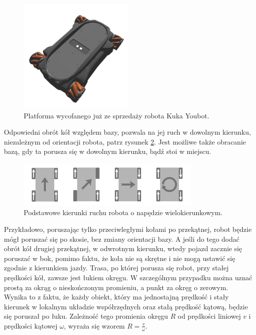	\begin{figure}[H]
	\centering
	\includegraphics[width=0.5\textwidth]{graphics/kuka_youbot.png}
	\caption{Platforma wycofanego już ze sprzedaży robota Kuka Youbot.}
	\label{fig:kuka_youbot}
	\end{figure} 

	Odpowiedni obrót kół względem bazy, pozwala na jej ruch w dowolnym kierunku, niezależnym od orientacji robota, patrz rysunek \ref{fig:mecanum_dirs}.
	Jest możliwe także obracanie bazą, gdy ta porusza się w dowolnym kierunku, bądź stoi w miejscu.
	
	\begin{figure}[H]
	\centering
	\includegraphics[width=0.8\textwidth]{graphics/mecanum_dirs.pdf}
	\caption{Podstawowe kierunki ruchu robota o napędzie wielokierunkowym.}
	\label{fig:mecanum_dirs}
	\end{figure} 
	
	Przykładowo, poruszając tylko przeciwległymi kołami po przekątnej, robot będzie mógł poruszać się po skosie, bez zmiany orientacji bazy.
	A jeśli do tego dodać obrót kół drugiej przekątnej, w odwrotnym kierunku, wtedy pojazd zacznie się poruszać w bok, pomimo faktu, że koła nie są skrętne i 
	nie mogą ustawić się zgodnie z kierunkiem jazdy.
	Trasa, po której porusza się robot, przy stałej prędkości kół, zawsze jest łukiem okręgu. W szczególnym przypadku można uznać prostą za okrąg o nieskończonym promieniu, a punkt za okręg o zerowym. 
	Wynika to z faktu, że każdy obiekt, który ma jednostajną prędkość i stały kierunek w lokalnym układzie współrzędnych oraz stałą prędkość kątową, będzie się poruszał po łuku.
	Zależność tego promienia okręgu $R$ od prędkości liniowej $v$ i prędkości kątowej $\omega$, wyraża się wzorem $R = \frac{v}{\omega}$.

